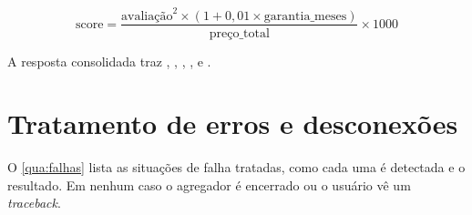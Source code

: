 \begin{equation}
  \text{score} = \frac{\text{avaliação}^2 \times (1 + 0{,}01 \times \text{garantia\_meses})}{\text{preço\_total}} \times 1000
\end{equation}

A resposta consolidada traz , , , ,  e .

\section{Tratamento de erros e desconexões}

O \autoref{qua:falhas} lista as situações de falha tratadas, como cada uma é detectada e o resultado. Em nenhum caso o agregador é encerrado ou o usuário vê um \textit{traceback}.

